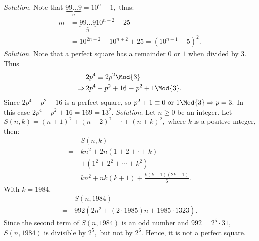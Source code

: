 \begin{multicols}{2}
\begin{align*}
	\end{align*}
	\textit{Solution.}
	Note that $\underbrace{99 \ldots 9}_{n} = 10^n-1,$ thus:
	\begin{align*}
		m &= \underbrace{99 \ldots 9}_{n} 10^{n+2} + 25 \\
		&= 10^{2n+2} - 10^{n+2} + 25 = {(10^{n+1} - 5)^2.}
	\end{align*}
	\vskip 0.1cm
	\textit{Solution.}
	Note that a perfect square has a remainder $0$ or $1$ when divided by $3$.
	Thus 
	\begin{align*}
		&2p^4 \equiv 2p^2 \Mod{3} \\
		\Rightarrow \,&2p^4-p^2 + 16 \equiv p^2 + 1 \Mod{3}.
	\end{align*}	
	Since $2p^4-p^2 + 16$ is a perfect square, so $p^2 + 1 \equiv 0 \text{\ or\ } 1 \Mod{3} \Rightarrow {p = 3.}$
	In this case $2p^4-p^2 + 16 = 169 = 13^2.$
	\vskip 0.1cm
	\vskip 0.2cm
	\textit{Solution.}
	Let $n \ge 0$ be an integer. Let $S(n, k) = (n+1)^2 + (n+2)^2 + \cdot + (n+k)^2,$ where $k$ is a positive integer, then:
	\begin{align*}
		&S(n, k) \\
		= \,&kn^2 + 2n(1+2+\cdot +k)\\
		&+(1^2+2^2+\cdots+k^2)\\
		= \,&kn^2 + nk(k+1) + \frac{k(k+1)(2k+1)}{6}.
	\end{align*}		
	With $k=1984,$ 
	\begin{align*}
		&S(n, 1984) \\
		= \,&992 (2n^2+(2\cdot 1985)n+ 1985\cdot 1323).
	\end{align*}
	Since the second term of $S(n, 1984)$ is an odd number and $992 = 2^5 \cdot 31,$ $S(n, 1984)$ is divisible by $2^5,$ 
	but not by $2^6.$ Hence, it is not a perfect square.
\end{multicols}